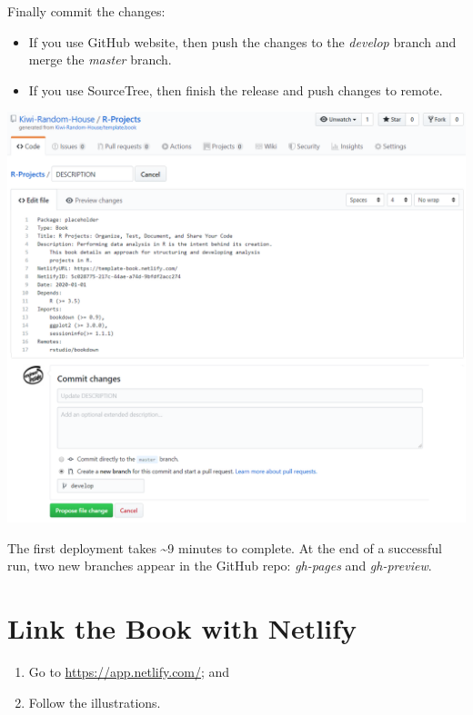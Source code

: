 \documentclass[]{book}
\providecommand{\tightlist}{%
  \setlength{\itemsep}{0pt}\setlength{\parskip}{0pt}}
\begin{document}
Finally commit the changes:

\begin{itemize}
\tightlist
\item
  If you use GitHub website, then push the changes to the \emph{develop} branch and
  merge the \emph{master} branch.
\item
  If you use SourceTree, then finish the release and push changes to remote.
\end{itemize}

\begin{center}\includegraphics[width=0.7\linewidth]{images/317f5871bf095360684ad70f23eec266} \end{center}

The first deployment takes \textasciitilde{}9 minutes to complete. At the end of a
successful run, two new branches appear in the GitHub repo: \emph{gh-pages} and
\emph{gh-preview}.

\hypertarget{link-the-book-with-netlify}{%
\section{Link the Book with Netlify}\label{link-the-book-with-netlify}}

\begin{enumerate}
\def\labelenumi{\arabic{enumi}.}
\tightlist
\item
  Go to \url{https://app.netlify.com/}; and
\item
  Follow the illustrations.
\end{enumerate}
\end{document}
